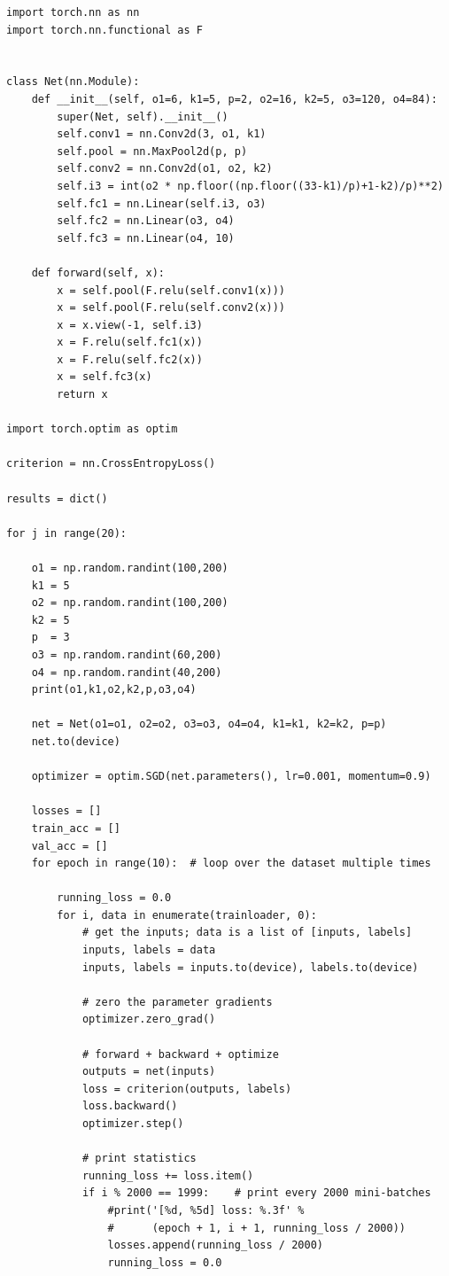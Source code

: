 \documentclass{article}
\begin{document}
\begin{enumerate}
\begin{verbatim}
import torch.nn as nn
import torch.nn.functional as F


class Net(nn.Module):
    def __init__(self, o1=6, k1=5, p=2, o2=16, k2=5, o3=120, o4=84):
        super(Net, self).__init__()
        self.conv1 = nn.Conv2d(3, o1, k1)
        self.pool = nn.MaxPool2d(p, p)
        self.conv2 = nn.Conv2d(o1, o2, k2)
        self.i3 = int(o2 * np.floor((np.floor((33-k1)/p)+1-k2)/p)**2)
        self.fc1 = nn.Linear(self.i3, o3)
        self.fc2 = nn.Linear(o3, o4)
        self.fc3 = nn.Linear(o4, 10)

    def forward(self, x):
        x = self.pool(F.relu(self.conv1(x)))
        x = self.pool(F.relu(self.conv2(x)))
        x = x.view(-1, self.i3)
        x = F.relu(self.fc1(x))
        x = F.relu(self.fc2(x))
        x = self.fc3(x)
        return x

import torch.optim as optim

criterion = nn.CrossEntropyLoss()

results = dict()

for j in range(20):

    o1 = np.random.randint(100,200)
    k1 = 5
    o2 = np.random.randint(100,200)
    k2 = 5
    p  = 3
    o3 = np.random.randint(60,200)
    o4 = np.random.randint(40,200)
    print(o1,k1,o2,k2,p,o3,o4)

    net = Net(o1=o1, o2=o2, o3=o3, o4=o4, k1=k1, k2=k2, p=p)
    net.to(device)

    optimizer = optim.SGD(net.parameters(), lr=0.001, momentum=0.9)

    losses = []
    train_acc = []
    val_acc = []
    for epoch in range(10):  # loop over the dataset multiple times

        running_loss = 0.0
        for i, data in enumerate(trainloader, 0):
            # get the inputs; data is a list of [inputs, labels]
            inputs, labels = data
            inputs, labels = inputs.to(device), labels.to(device)

            # zero the parameter gradients
            optimizer.zero_grad()

            # forward + backward + optimize
            outputs = net(inputs)
            loss = criterion(outputs, labels)
            loss.backward()
            optimizer.step()

            # print statistics
            running_loss += loss.item()
            if i % 2000 == 1999:    # print every 2000 mini-batches
                #print('[%d, %5d] loss: %.3f' %
                #      (epoch + 1, i + 1, running_loss / 2000))
                losses.append(running_loss / 2000)
                running_loss = 0.0


\end{verbatim}
\end{enumerate}
\end{document}
